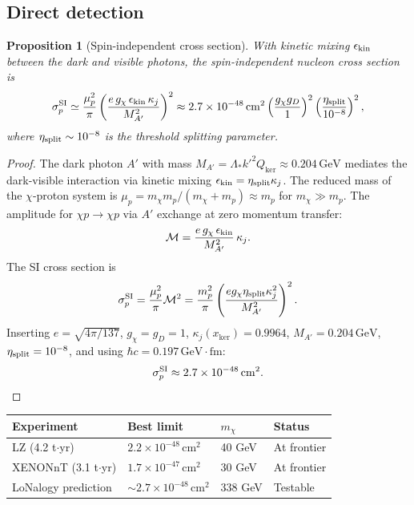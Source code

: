 \documentclass[12pt]{article}
\theoremstyle{plain}
\newtheorem{proposition}[theorem]{Proposition}
\theoremstyle{definition}
\numberwithin{equation}{section}
\newcommand{\kker}{\mathrm{ker}}
\begin{document}
\subsection{Direct detection}

\begin{proposition}[Spin-independent cross section]\label{prop:directdetect}
With kinetic mixing $\epsilon_{\rm kin}$ between the dark and visible
photons, the spin-independent nucleon cross section is
\[
\sigma_p^{\rm SI} \simeq
\frac{\mu_p^2}{\pi}
\left(\frac{e\,g_\chi\,\epsilon_{\rm kin}\,\kappa_j}{M_{A'}^2}\right)^2
\approx 2.7\times10^{-48}\,\mathrm{cm}^2
\left(\frac{g_\chi g_D}{1}\right)^2
\left(\frac{\eta_{\rm split}}{10^{-8}}\right)^2,
\]
where $\eta_{\rm split}\sim10^{-8}$ is the threshold splitting parameter.
\end{proposition}

\begin{proof}
The dark photon $A'$ with mass $M_{A'}=\Lambda_* k'^2 Q_{\kker}\approx0.204\,\mathrm{GeV}$
mediates the dark-visible interaction via kinetic mixing $\epsilon_{\rm kin}=\eta_{\rm split}\kappa_j$.
The reduced mass of the $\chi$-proton system is $\mu_p=m_\chi m_p/(m_\chi+m_p)\approx m_p$ for $m_\chi\gg m_p$.
The amplitude for $\chi p\to\chi p$ via $A'$ exchange at zero momentum transfer:
\[
\mathcal{M} = \frac{e\,g_\chi\,\epsilon_{\rm kin}}{M_{A'}^2}\,\kappa_j.
\]
The SI cross section is
\[
\sigma_p^{\rm SI}=\frac{\mu_p^2}{\pi}\mathcal{M}^2
=\frac{m_p^2}{\pi}\left(\frac{e g_\chi\eta_{\rm split}\kappa_j^2}{M_{A'}^2}\right)^2.
\]
Inserting $e=\sqrt{4\pi/137}$, $g_\chi=g_D=1$, $\kappa_j(x_{\kker})=0.9964$,
$M_{A'}=0.204\,\mathrm{GeV}$, $\eta_{\rm split}=10^{-8}$,
and using $\hbar c=0.197\,\mathrm{GeV}\cdot\mathrm{fm}$:
\[
\sigma_p^{\rm SI}\approx2.7\times10^{-48}\,\mathrm{cm}^2.
\]
\end{proof}

\begin{center}
\begin{tabular}{llll}
\toprule
Experiment & Best limit & $m_\chi$ & Status\\
\midrule
LZ (4.2 t$\cdot$yr) & $2.2\times10^{-48}\,\mathrm{cm}^2$ & 40 GeV & At frontier\\
XENONnT (3.1 t$\cdot$yr) & $1.7\times10^{-47}\,\mathrm{cm}^2$ & 30 GeV & At frontier\\
\midrule
LoNalogy prediction & $\sim2.7\times10^{-48}\,\mathrm{cm}^2$ & 338 GeV & Testable\\
\bottomrule
\end{tabular}
\end{center}
\end{document}
